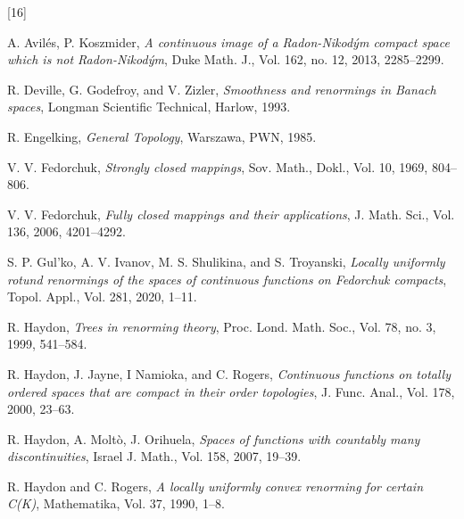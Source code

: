 \documentclass[11pt]{article}
\theoremstyle{definition}
\theoremstyle{remark}
\begin{document}
\begin{thebibliography}{[16]}
	
	
	
	
	\normalsize
	\baselineskip=17pt
	
	
	
	 A. Avil\'es, P. Koszmider, \emph{A continuous image of a Radon-Nikod\'ym compact space which is not Radon-Nikod\'ym}, Duke Math. J., Vol. 162, no. 12, 2013, 2285--2299.
	
	R. Deville, G. Godefroy, and V. Zizler, \emph{Smoothness and renormings in Banach spaces}, Longman Scientific Technical, Harlow, 1993.
	
	R. Engelking, \emph{General Topology}, Warszawa, PWN, 1985.
	
	V. V. Fedorchuk, \emph{Strongly closed mappings}, Sov. Math., Dokl., Vol. 10, 1969, 804--806.
	
	V. V. Fedorchuk, \emph{Fully closed mappings and their applications}, J. Math. Sci., Vol. 136, 2006, 4201--4292.
	
	S. P. Gul’ko, A. V. Ivanov, M. S. Shulikina, and S. Troyanski, \emph{Locally uniformly rotund renormings of the spaces of continuous functions on Fedorchuk compacts}, Topol. Appl., Vol. 281, 2020, 1--11.
	
	 R. Haydon, \emph{Trees in renorming theory}, Proc. Lond. Math. Soc., Vol. 78, no. 3, 1999, 541--584.
	
	R. Haydon, J. Jayne, I Namioka, and C. Rogers, \emph{Continuous functions on totally ordered spaces that are compact in their order topologies}, J. Func. Anal., Vol. 178, 2000, 23--63.
	
	 R. Haydon, A. Molt\`o, J. Orihuela, \emph{Spaces of functions with countably many discontinuities}, Israel J. Math., Vol. 158, 2007, 19--39.
	
	R. Haydon and C. Rogers, \emph{A locally uniformly convex renorming for certain C(K)}, Mathematika, Vol. 37, 1990, 1--8.
	

\end{thebibliography}
\end{document}

